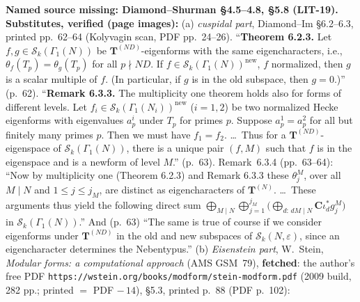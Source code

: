 \begin{hypothesis}\label{lit:hz-es-anemic}
  \leanok
  \textbf{Named source missing: Diamond--Shurman \S4.5--4.8, \S5.8 (LIT-19). Substitutes, verified (page images):}
  (a) \emph{cuspidal part}, Diamond--Im \S6.2--6.3, printed pp.~62--64 (Kolyvagin scan, PDF pp.~24--26). ``\textbf{Theorem 6.2.3.} Let
  $f,g\in\mathcal S_k(\Gamma_1(N))$ be $\mathbf T^{(ND)}$-eigenforms with the same eigencharacters, i.e., $\theta_f(T_p)=\theta_g(T_p)$ for all
  $p\nmid ND$. If $f\in\mathcal S_k(\Gamma_1(N))^{\mathrm{new}}$, $f$ normalized, then $g$ is a scalar multiple of $f$. (In particular, if $g$ is in the
  old subspace, then $g=0$.)'' (p.~62). ``\textbf{Remark 6.3.3.} The multiplicity one theorem holds also for forms of different levels. Let
  $f_i\in\mathcal S_k(\Gamma_1(N_i))^{\mathrm{new}}$ ($i=1,2$) be two normalized Hecke eigenforms with eigenvalues $a^i_p$ under $T_p$ for primes $p$.
  Suppose $a^1_p=a^2_p$ for all but finitely many primes $p$. Then we must have $f_1=f_2$. \dots\ Thus for a $\mathbf T^{(ND)}$-eigenspace of
  $\mathcal S_k(\Gamma_1(N))$, there is a unique pair $(f,M)$ such that $f$ is in the eigenspace and is a newform of level $M$.'' (p.~63).
  Remark~6.3.4 (pp.~63--64): ``Now by multiplicity one (Theorem 6.2.3) and Remark 6.3.3 these $\theta^M_j$, over all $M\mid N$ and $1\le j\le j_M$,
  are distinct as eigencharacters of $\mathbf T^{(N)}$. \dots\ These arguments thus yield the following direct sum
  $\bigoplus_{M\mid N}\bigoplus_{j=1}^{j_M}\bigl(\bigoplus_{d:\,dM\mid N}\mathbf C\iota^*_dg^M_j\bigr)$ in $\mathcal S_k(\Gamma_1(N))$.'' And
  (p.~63) ``The same is true of course if we consider eigenforms under $\mathbf T^{(ND)}$ in the old and new subspaces of $\mathcal S_k(N,\varepsilon)$,
  since an eigencharacter determines the Nebentypus.''
  (b) \emph{Eisenstein part}, W.~Stein, \emph{Modular forms: a computational approach} (AMS GSM~79), \textbf{fetched}: the author's free PDF
  \texttt{https://wstein.org/books/modform/stein-modform.pdf} (2009 build, 282 pp.; printed $=$ PDF $-\,14$), \S5.3, printed p.~88 (PDF p.~102):

\end{hypothesis}
